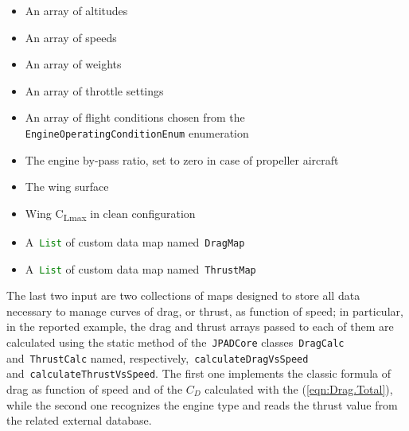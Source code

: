 %
\begin{itemize}
\item An array of altitudes
\item An array of speeds
\item An array of weights
\item An array of throttle settings
\item An array of flight conditions chosen from the \lstinline[language=Java]!EngineOperatingConditionEnum! enumeration
\item The engine by-pass ratio, set to zero in case of propeller aircraft
\item The wing surface
\item Wing C\textsubscript{Lmax} in clean configuration
\item A~\lstinline[language=Java]!List! of custom data map named~\lstinline[language=Java]!DragMap!
\item A~\lstinline[language=Java]!List! of custom data map named~\lstinline[language=Java]!ThrustMap!
\end{itemize}

\bigskip
\noindent
The last two input are two collections of maps designed to store all data necessary to manage curves of drag, or thrust, as function of speed; in particular, in the reported example, the drag and thrust arrays passed to each of them are calculated using the static method of the~\lstinline[language=Java]!JPADCore! classes~\lstinline[language=Java]!DragCalc! and~\lstinline[language=Java]!ThrustCalc! named, respectively,~\lstinline[language=Java]!calculateDragVsSpeed! and~\lstinline[language=Java]!calculateThrustVsSpeed!. 
%
The first one implements the classic formula of drag as function of speed and of the $C_{D}$ calculated with the (\ref{eqn:Drag.Total}), while the second one recognizes the engine type and reads the thrust value from the related external database.


